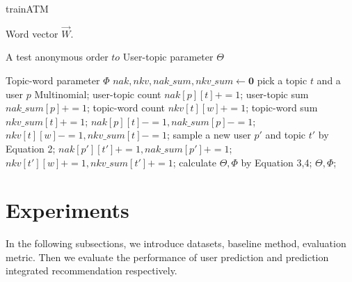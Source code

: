 \documentclass{sig-alternate-05-2015}
\begin{document}
\begin{algorithm}[htb]
\caption{trainATM}
\label{alg0}
\begin{algorithmic}[1]
\REQUIRE
Word vector $\overrightarrow{W}$. \par
A test anonymous order $to$
\ENSURE 
User-topic parameter $\Theta$ \par
Topic-word parameter $\Phi$
\STATE $nak , nkv, nak\_sum, nkv\_sum \leftarrow \mathbf{0}$
\STATE pick a topic $t$ and a user $p$ Multinomial;
\STATE user-topic count $nak[p][t] += 1$;
\STATE user-topic sum $nak\_sum[p] += 1$;
\STATE topic-word count $nkv[t][w] += 1$;
\STATE topic-word sum $nkv\_sum[t] += 1$;
\ENDFOR
\ENDFOR
{}
\STATE $nak[p][t] -= 1, nak\_sum[p] -= 1$;
\STATE $nkv[t][w] -= 1, nkv\_sum[t] -= 1$;
\STATE sample a new user $p'$ and topic $t'$ by Equation 2;
\STATE $nak[p'][t'] += 1, nak\_sum[p'] += 1$;
\STATE $nkv[t'][w] += 1, nkv\_sum[t'] += 1$;
\ENDFOR
\ENDFOR
\ENDWHILE
\STATE calculate $\Theta,\Phi$ by Equation 3,4;
\RETURN $\Theta,\Phi$;
\end{algorithmic} 
\end{algorithm}


\section{Experiments}
In the following subsections, we introduce datasets, baseline method, evaluation metric. Then we evaluate the performance of user prediction and prediction integrated recommendation respectively.
\end{document}

